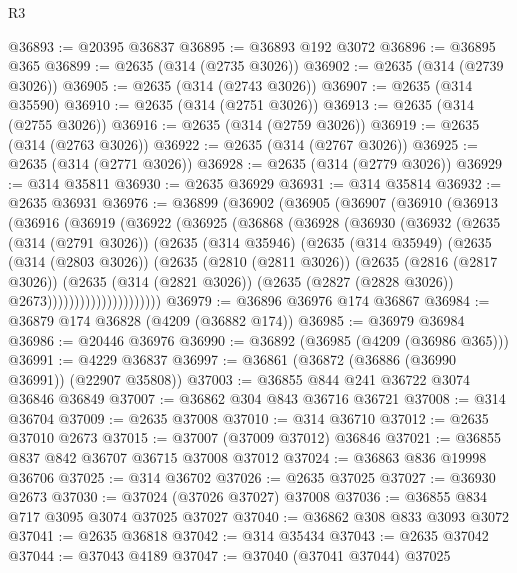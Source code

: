 \begin{lexlean}{R3}
\begin{coremodule}
@36893 := @20395 @36837
@36895 := @36893 @192 @3072
@36896 := @36895 @365
@36899 := @2635 (@314 (@2735 @3026))
@36902 := @2635 (@314 (@2739 @3026))
@36905 := @2635 (@314 (@2743 @3026))
@36907 := @2635 (@314 @35590)
@36910 := @2635 (@314 (@2751 @3026))
@36913 := @2635 (@314 (@2755 @3026))
@36916 := @2635 (@314 (@2759 @3026))
@36919 := @2635 (@314 (@2763 @3026))
@36922 := @2635 (@314 (@2767 @3026))
@36925 := @2635 (@314 (@2771 @3026))
@36928 := @2635 (@314 (@2779 @3026))
@36929 := @314 @35811
@36930 := @2635 @36929
@36931 := @314 @35814
@36932 := @2635 @36931
@36976 := @36899
    (@36902
      (@36905
        (@36907
          (@36910
            (@36913
              (@36916
                (@36919
                  (@36922
                    (@36925
                      (@36868
                        (@36928
                          (@36930
                            (@36932
                              (@2635
                                (@314 (@2791 @3026))
                                (@2635
                                  (@314 @35946)
                                  (@2635
                                    (@314 @35949)
                                    (@2635
                                      (@314 (@2803 @3026))
                                      (@2635
                                        (@2810 (@2811 @3026))
                                        (@2635
                                          (@2816 (@2817 @3026))
                                          (@2635
                                            (@314 (@2821 @3026))
                                            (@2635 (@2827 (@2828 @3026)) @2673)))))))))))))))))))))
@36979 := @36896 @36976 @174 @36867
@36984 := @36879 @174 @36828 (@4209 (@36882 @174))
@36985 := @36979 @36984
@36986 := @20446 @36976
@36990 := @36892 (@36985 (@4209 (@36986 @365)))
@36991 := @4229 @36837
@36997 := @36861 (@36872 (@36886 (@36990 @36991)) (@22907 @35808))
@37003 := @36855 @844 @241 @36722 @3074 @36846 @36849
@37007 := @36862 @304 @843 @36716 @36721
@37008 := @314 @36704
@37009 := @2635 @37008
@37010 := @314 @36710
@37012 := @2635 @37010 @2673
@37015 := @37007 (@37009 @37012) @36846
@37021 := @36855 @837 @842 @36707 @36715 @37008 @37012
@37024 := @36863 @836 @19998 @36706
@37025 := @314 @36702
@37026 := @2635 @37025
@37027 := @36930 @2673
@37030 := @37024 (@37026 @37027) @37008
@37036 := @36855 @834 @717 @3095 @3074 @37025 @37027
@37040 := @36862 @308 @833 @3093 @3072
@37041 := @2635 @36818
@37042 := @314 @35434
@37043 := @2635 @37042
@37044 := @37043 @4189
@37047 := @37040 (@37041 @37044) @37025

\end{coremodule}
\end{lexlean}
